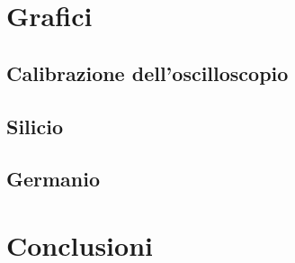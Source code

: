 \documentclass[]{article}
\begin{document}
\section{Grafici}

\subsection{Calibrazione dell'oscilloscopio}
\subsection{Silicio}
\subsection{Germanio}
\section*{Conclusioni}
\end{document}
